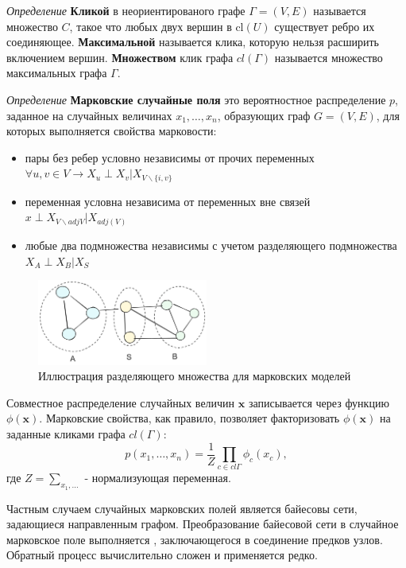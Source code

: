 \textit{Определение} \textbf{Кликой} в неориентированого графе $\Gamma=(V,E)$ называется множество $C$, такое
что любых двух вершин в $\text{cl}(U)$ существует ребро их соединяющее. \textbf{Максимальной} называется клика, которую
нельзя расширить включением вершин. \textbf{Множеством} клик графа $cl(\Gamma)$ называется множество максимальных графа $\Gamma$.


\textit{Определение} \textbf{Марковские случайные поля} это
вероятностное распределение $p$, заданное на случайных величинах $x_1, \dots,x_n$, образующих
граф $G=(V,E)$, для которых выполняется свойства марковости: \begin{itemize}
    \item пары без ребер условно независимы от прочих переменных $\forall u,v \in V \rightarrow X_u \perp X_v | X_{V \backslash \{i,v\}}$
    \item переменная условна независима от переменных вне связей $x \perp X_{V \backslash adj{V}} |X_{adj(V)} $
    \item любые два подмножества независимы с учетом разделяющего подмножества $X_A \perp X_B | X_S$
\end{itemize}

\begin{figure}[h]
    \centering
    \includegraphics[width=0.5\textwidth]{assets/math/discrete/indep.excalidraw.png}
    \caption{Иллюстрация разделяющего множества для марковских моделей}
    \label{discr_vs_gen}
\end{figure}

Совместное распределение случайных величин $\mathbf{x}$ записывается через функцию $\phi(\mathbf{x})$. 
Марковские свойства, как правило, позволяет факторизовать  $\phi(\mathbf{x})$ на  заданные кликами графа $cl(\Gamma)$:\begin{equation}
    p(x_1, \dots, x_n) = \frac{1}{Z} \prod_{c \in cl{\Gamma}} \phi_c(x_c),
\end{equation} где $Z = \sum_{x_1, \dots}$ - нормализующая переменная.

Частным случаем случайных марковских полей является байесовы сети, задающиеся направленным графом.
Преобразование байесовой сети в случайное марковское поле выполняется , заключающегося
в соединение предков узлов. Обратный процесс вычислительно сложен и применяется редко.

